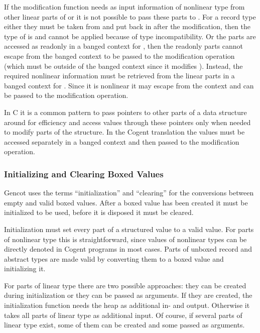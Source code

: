 If the modification function  needs as input information of nonlinear type from other linear parts of  or  it is not
possible to pass these parts to . For a record type  either they must be taken from  and put back in after the modification, then
the type of  is  and  cannot be applied because of type incompatibility. Or the parts are
accessed as readonly in a banged context for , then the readonly parts cannot escape from the banged context to be passed to the
modification operation (which must be outside of the banged context since it modifies ). Instead, the required nonlinear information must 
be retrieved from the linear parts in a banged context for . Since it is nonlinear it may escape from the context and can be passed 
to the modification operation.

In C it is a common pattern to pass pointers to other parts of a data structure around for efficiency and access values through these pointers 
only when needed to modify parts of the structure. In the Cogent translation the values must be accessed separately in a banged context and then
passed to the modification operation.

\subsubsection{Initializing and Clearing Boxed Values}

Gencot uses the terms ``initialization'' and ``clearing'' for the conversions between empty and valid boxed values.
After a boxed value has been created it must be initialized to be used, before it is disposed it must be cleared.

Initialization must set every part of a structured value to a valid value. For parts of nonlinear type this is
straightforward, since values of nonlinear types can be directly denoted in Cogent programs in most cases. Parts
of unboxed record and abstract types are made valid by converting them to a boxed value and initializing it.

For parts of linear type there are two possible approaches: they can be created during initialization 
or they can be passed as arguments. If they are created, the initialization function needs the heap as additional 
in- and output. Otherwise it takes all parts of linear type as additional input. Of course, if several parts
of linear type exist, some of them can be created and some passed as arguments.

